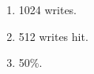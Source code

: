 \documentclass{article}
\begin{document}
\begin{enumerate}[label=\textbf{\Alph*.}]
	\item 1024 writes.
	\item 512 writes hit.
	\item 50\%.
\end{enumerate}
\end{document}
